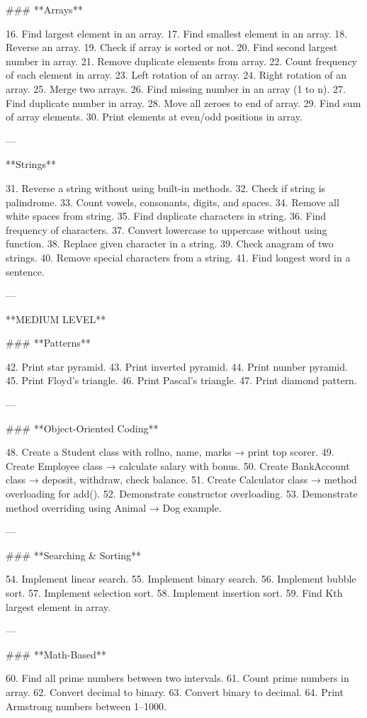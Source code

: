 ### **Arrays**

16. Find largest element in an array.
17. Find smallest element in an array.
18. Reverse an array.
19. Check if array is sorted or not.
20. Find second largest number in array.
21. Remove duplicate elements from array.
22. Count frequency of each element in array.
23. Left rotation of an array.
24. Right rotation of an array.
25. Merge two arrays.
26. Find missing number in an array (1 to n).
27. Find duplicate number in array.
28. Move all zeroes to end of array.
29. Find sum of array elements.
30. Print elements at even/odd positions in array.

---

 **Strings**

31. Reverse a string without using built-in methods.
32. Check if string is palindrome.
33. Count vowels, consonants, digits, and spaces.
34. Remove all white spaces from string.
35. Find duplicate characters in string.
36. Find frequency of characters.
37. Convert lowercase to uppercase without using function.
38. Replace given character in a string.
39. Check anagram of two strings.
40. Remove special characters from a string.
41. Find longest word in a sentence.

---

 **MEDIUM LEVEL**

### **Patterns**

42. Print star pyramid.
43. Print inverted pyramid.
44. Print number pyramid.
45. Print Floyd’s triangle.
46. Print Pascal’s triangle.
47. Print diamond pattern.

---

### **Object-Oriented Coding**

48. Create a Student class with rollno, name, marks → print top scorer.
49. Create Employee class → calculate salary with bonus.
50. Create BankAccount class → deposit, withdraw, check balance.
51. Create Calculator class → method overloading for add().
52. Demonstrate constructor overloading.
53. Demonstrate method overriding using Animal → Dog example.

---

### **Searching & Sorting**

54. Implement linear search.
55. Implement binary search.
56. Implement bubble sort.
57. Implement selection sort.
58. Implement insertion sort.
59. Find Kth largest element in array.

---

### **Math-Based**

60. Find all prime numbers between two intervals.
61. Count prime numbers in array.
62. Convert decimal to binary.
63. Convert binary to decimal.
64. Print Armstrong numbers between 1–1000.

